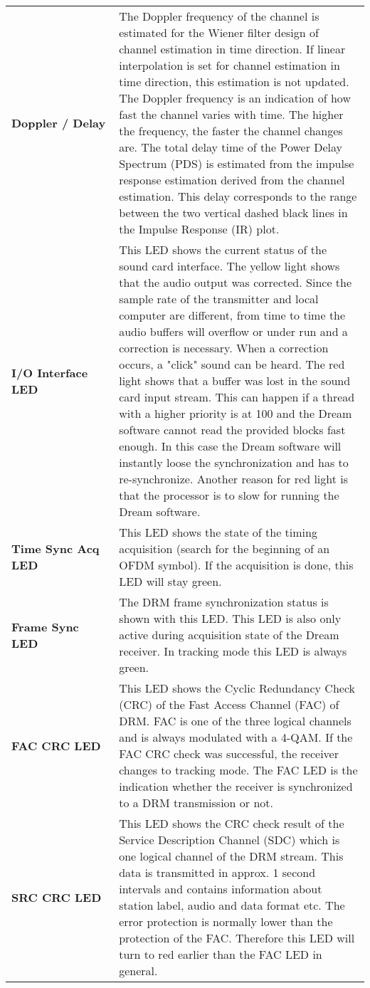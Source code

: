 \begin{table}[h]
\begin{center}
\begin{tabular}{p{0.3\linewidth} | p{0.7\linewidth}}
			\textbf{Doppler / Delay} & The Doppler frequency of the channel is estimated for the Wiener filter design of channel estimation in time direction. If linear interpolation is set for channel estimation in time direction, this estimation is not updated. The Doppler frequency is an indication of how fast the channel varies with time. The higher the frequency, the faster the channel changes are.
			The total delay time of the Power Delay Spectrum (PDS) is estimated from the impulse response estimation derived from the channel estimation. This delay corresponds to the range between the two vertical dashed black lines in the Impulse Response (IR) plot. \\
			\textbf{I/O Interface LED} & This LED shows the current status of the sound card interface. The yellow light shows that the audio output was corrected. Since the sample rate of the transmitter and local computer are different, from time to time the audio buffers will overflow or under run and a correction is necessary. When a correction occurs, a "click" sound can be heard. The red light shows that a buffer was lost in the sound card input stream. This can happen if a thread with a higher priority is at 100 and the Dream software cannot read the provided blocks fast enough. In this case the Dream software will instantly loose the synchronization and has to re-synchronize. Another reason for red light is that the processor is to slow for running the Dream software.
			\\
			\textbf{Time Sync Acq LED} & This LED shows the state of the timing acquisition (search for the beginning of an OFDM symbol). If the acquisition is done, this LED will stay green.
			\\
			\textbf{Frame Sync LED} & The DRM frame synchronization status is shown with this LED. This LED is also only active during acquisition state of the Dream receiver. In tracking mode this LED is always green.
			\\
			\textbf{FAC CRC LED} & This LED shows the Cyclic Redundancy Check (CRC) of the Fast Access Channel (FAC) of DRM. FAC is one of the three logical channels and is always modulated with a 4-QAM. If the FAC CRC check was successful, the receiver changes to tracking mode. The FAC LED is the indication whether the receiver is synchronized to a DRM transmission or not. \\
			\textbf{SRC CRC LED} & 	This LED shows the CRC check result of the Service Description Channel (SDC) which is one logical channel of the DRM stream. This data is transmitted in approx. 1 second intervals and contains information about station label, audio and data format etc. The error protection is normally lower than the protection of the FAC. Therefore this LED will turn to red earlier than the FAC LED in general. \\

\end{tabular}
\end{center}
\end{table}
